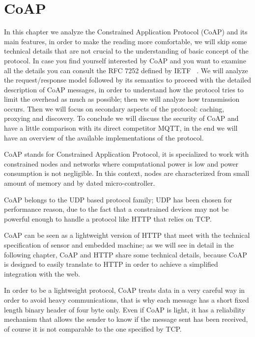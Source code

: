 
	\chapter{CoAP}\label{ch:coap}
	In this chapter we analyze the Constrained Application Protocol (CoAP) and its main features, in order to make the reading more comfortable,
	we will skip some technical details that are not crucial to the understanding of basic concept of the protocol.\newline
	In case you find yourself interested by CoAP and you want to examine all the details you can consult
	the RFC 7252 defined by IETF ~\cite{rfccoap}. \newline
	We will analyze the request/response model followed by its semantics to proceed with the detailed description of CoAP messages, in order to understand how the protocol tries to limit the overhead as much as possible; then we will analyze how transmission occurs.\newline
	Then we will focus on secondary aspects of the protocol: caching, proxying and discovery.\newline
	To conclude we will discuss the security of CoAP and have a little comparison with its direct competitor MQTT, in the end we will have an overview of the available implementations of the protocol.\newline
	
	CoAP stands for Constrained Application Protocol, it is specialized to work with constrained nodes and networks where computational power is low and power consumption is not negligible.\newline
	In this context, nodes are characterized from small amount of memory and by dated micro-controller.\newline

	CoAP belongs to the UDP based protocol family; UDP has been chosen for performance reason, due to the fact that a constrained devices may not be powerful enough to handle a protocol like HTTP that relies on TCP.\newline
	
	CoAP can be seen as a lightweight version of HTTP that meet with the technical specification of sensor and embedded machine; as we will see in detail in the following chapter, CoAP and HTTP share some technical details, because CoAP is designed to easily translate to HTTP in order to achieve a simplified integration with the web.\newline

	In order to be a lightweight protocol, CoAP treats data in a very careful way in order to avoid heavy communications, that is why each message has a short fixed length binary header of four byte only. Even if CoAP is light, it has a reliability mechanism that allows the sender to know if the message sent has been received, of course it is not comparable to the one specified by TCP.\newline
	

